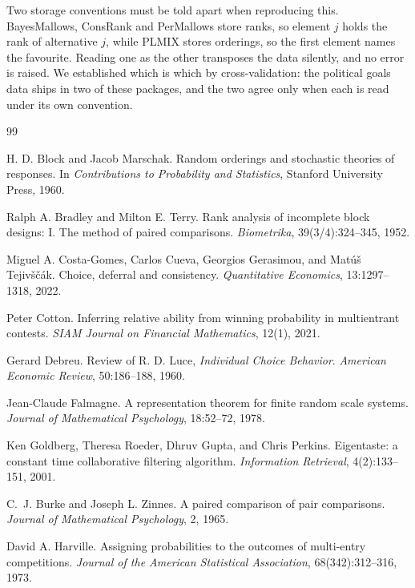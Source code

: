 \documentclass[11pt]{article}
\begin{document}
Two storage conventions must be told apart when reproducing this. BayesMallows,
ConsRank and PerMallows store ranks, so element $j$ holds the rank of alternative
$j$, while PLMIX stores orderings, so the first element names the favourite.
Reading one as the other transposes the data silently, and no error is raised. We
established which is which by cross-validation: the political goals data ships in
two of these packages, and the two agree only when each is read under its own
convention.

\begin{thebibliography}{99}

H. D. Block and Jacob Marschak.
Random orderings and stochastic theories of responses.
In \emph{Contributions to Probability and Statistics}, Stanford University Press,
1960.

Ralph A. Bradley and Milton E. Terry.
Rank analysis of incomplete block designs: I. The method of paired comparisons.
\emph{Biometrika}, 39(3/4):324--345, 1952.

Miguel A. Costa-Gomes, Carlos Cueva, Georgios Gerasimou, and Mat\'u\v{s}
Tejiv\v{s}\v{c}\'ak.
Choice, deferral and consistency.
\emph{Quantitative Economics}, 13:1297--1318, 2022.

Peter Cotton.
Inferring relative ability from winning probability in multientrant contests.
\emph{SIAM Journal on Financial Mathematics}, 12(1), 2021.

Gerard Debreu.
Review of R. D. Luce, \emph{Individual Choice Behavior}.
\emph{American Economic Review}, 50:186--188, 1960.

Jean-Claude Falmagne.
A representation theorem for finite random scale systems.
\emph{Journal of Mathematical Psychology}, 18:52--72, 1978.

Ken Goldberg, Theresa Roeder, Dhruv Gupta, and Chris Perkins.
Eigentaste: a constant time collaborative filtering algorithm.
\emph{Information Retrieval}, 4(2):133--151, 2001.

C.~J. Burke and Joseph L. Zinnes.
A paired comparison of pair comparisons.
\emph{Journal of Mathematical Psychology}, 2, 1965.

David A. Harville.
Assigning probabilities to the outcomes of multi-entry competitions.
\emph{Journal of the American Statistical Association}, 68(342):312--316, 1973.


\end{thebibliography}
\end{document}
